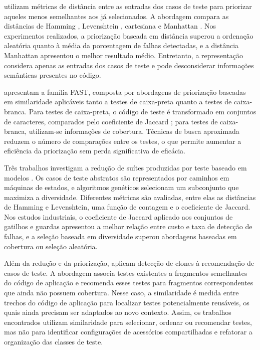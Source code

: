  utilizam métricas de distância entre as entradas dos casos de teste para priorizar aqueles menos semelhantes aos já selecionados. A abordagem compara as distâncias de Hamming \cite{hamming:1950}, Levenshtein \cite{levenshtein:1966}, cartesiana e Manhattan \cite{deza:etal:2009}. Nos experimentos realizados, a priorização baseada em distância superou a ordenação aleatória quanto à média da porcentagem de falhas detectadas, e a distância Manhattan apresentou o melhor resultado médio. Entretanto, a representação considera apenas as entradas dos casos de teste e pode desconsiderar informações semânticas presentes no código.

 apresentam a família FAST, composta por abordagens de priorização baseadas em similaridade aplicáveis tanto a testes de caixa-preta quanto a testes de caixa-branca. Para testes de caixa-preta, o código de teste é transformado em conjuntos de caracteres, comparados pelo coeficiente de Jaccard \cite{jaccard:1912}; para testes de caixa-branca, utilizam-se informações de cobertura. Técnicas de busca aproximada reduzem o número de comparações entre os testes, o que permite aumentar a eficiência da priorização sem perda significativa de eficácia.

Três trabalhos investigam a redução de suítes produzidas por teste baseado em modelos \cite{hemmati:etal:2010:a,hemmati:etal:2010:b,hemmati:etal:2010:c}. Os casos de teste abstratos são representados por caminhos em máquinas de estados, e algoritmos genéticos selecionam um subconjunto que maximiza a diversidade. Diferentes métricas são avaliadas, entre elas as distâncias de Hamming e Levenshtein, uma função de contagem e o coeficiente de Jaccard. Nos estudos industriais, o coeficiente de Jaccard aplicado aos conjuntos de gatilhos e guardas apresentou a melhor relação entre custo e taxa de detecção de falhas, e a seleção baseada em diversidade superou abordagens baseadas em cobertura ou seleção aleatória.

Além da redução e da priorização,  aplicam detecção de clones à recomendação de casos de teste. A abordagem associa testes existentes a fragmentos semelhantes do código de aplicação e recomenda esses testes para fragmentos correspondentes que ainda não possuem cobertura. Nesse caso, a similaridade é medida entre trechos do código de aplicação para localizar testes potencialmente reusáveis, os quais ainda precisam ser adaptados ao novo contexto. Assim, os trabalhos encontrados utilizam similaridade para selecionar, ordenar ou recomendar testes, mas não para identificar configurações de acessórios compartilhadas e refatorar a organização das classes de teste.

